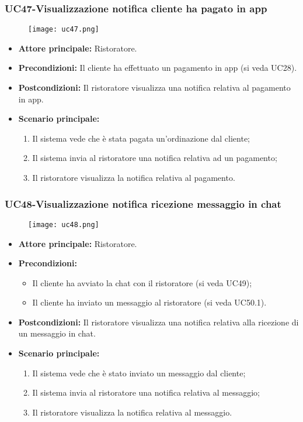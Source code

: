 \pagebreak
\subsubsection{UC47-Visualizzazione notifica cliente ha pagato in app}
\begin{figure}[h] \texttt{[image: uc47.png]} \end{figure}
\begin{itemize}
\item \textbf{Attore principale:} Ristoratore.
\item \textbf{Precondizioni:} Il cliente ha effettuato un pagamento in app (si veda UC28).
\item \textbf{Postcondizioni:} Il ristoratore visualizza una notifica relativa al pagamento in app.
\item \textbf{Scenario principale:}
\begin{enumerate}
    \item Il sistema vede che è stata pagata un'ordinazione dal cliente;
    \item Il sistema invia al ristoratore una notifica relativa ad un pagamento;
    \item Il ristoratore visualizza la notifica relativa al pagamento.
\end{enumerate}
\end{itemize}

\subsubsection{UC48-Visualizzazione notifica ricezione messaggio in chat}
\begin{figure}[h] \texttt{[image: uc48.png]} \end{figure}
\begin{itemize}
\item \textbf{Attore principale:} Ristoratore.
\item \textbf{Precondizioni:}
\begin{itemize}
    \item Il cliente ha avviato la chat con il ristoratore (si veda UC49);
    \item Il cliente ha inviato un messaggio al ristoratore (si veda UC50.1).
\end{itemize}
\item \textbf{Postcondizioni:} Il ristoratore visualizza una notifica relativa alla ricezione di un messaggio in chat.
\item \textbf{Scenario principale:}
\begin{enumerate}
    \item Il sistema vede che è stato inviato un messaggio dal cliente;
    \item Il sistema invia al ristoratore una notifica relativa al messaggio;
    \item Il ristoratore visualizza la notifica relativa al messaggio.
\end{enumerate}
\end{itemize}


